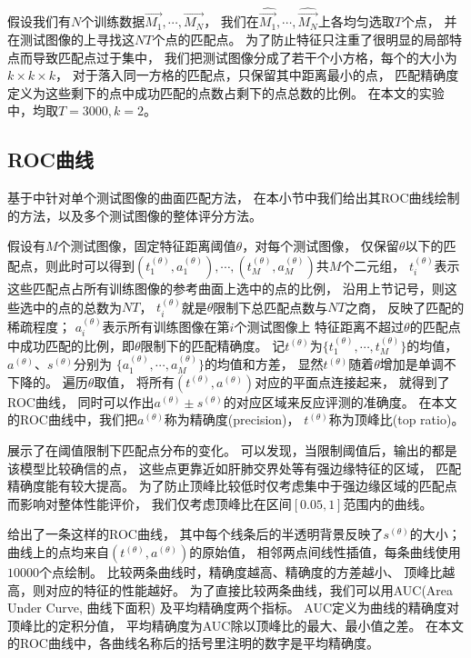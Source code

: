 假设我们有$N$个训练数据$\vec{M_1},\cdots,\vec{M_N}$，
我们在$\hat{\vec{M_1}},\cdots,\hat{\vec{M_N}}$上各均匀选取$T$个点，
并在测试图像的上寻找这$NT$个点的匹配点。
为了防止特征只注重了很明显的局部特点而导致匹配点过于集中，
我们把测试图像分成了若干个小方格，每个的大小为$k\times k \times k$，
对于落入同一方格的匹配点，只保留其中距离最小的点，
匹配精确度定义为这些剩下的点中成功匹配的点数占剩下的点总数的比例。
在本文的实验中，均取$T=3000, k=2$。


\subsection{ROC曲线}
基于中针对单个测试图像的曲面匹配方法，
在本小节中我们给出其ROC曲线绘制的方法，以及多个测试图像的整体评分方法。

假设有$M$个测试图像，固定特征距离阈值$\theta$，对每个测试图像，
仅保留$\theta$以下的匹配点，则此时可以得到$(t_1^{(\theta)},
a_1^{(\theta)}),\cdots,(t_M^{(\theta)}, a_M^{(\theta)})$共$M$个二元组，
$t_i^{(\theta)}$表示这些匹配点占所有训练图像的参考曲面上选中的点的比例，
沿用上节记号，则这些选中的点的总数为$NT$，
$t_i^{(\theta)}$就是$\theta$限制下总匹配点数与$NT$之商，
反映了匹配的稀疏程度；
$a_i^{(\theta)}$表示所有训练图像在第$i$个测试图像上
特征距离不超过$\theta$的匹配点中成功匹配的比例，即$\theta$限制下的匹配精确度。
记$t^{(\theta)}$为$\{t_1^{(\theta)},\cdots,t_M^{(\theta)}\}$的均值，
$a^{(\theta)}$、$s^{(\theta)}$分别为
$\{a_1^{(\theta)},\cdots,a_M^{(\theta)}\}$的均值和方差，
显然$t^{(\theta)}$随着$\theta$增加是单调不下降的。
遍历$\theta$取值，
将所有$(t^{(\theta)}, a^{(\theta)})$对应的平面点连接起来，
就得到了ROC曲线，
同时可以作出$a^{(\theta)} \pm s^{(\theta)}$的对应区域来反应评测的准确度。
在本文的ROC曲线中，我们把$a^{(\theta)}$称为精确度(precision)，
$t^{(\theta)}$称为顶峰比(top ratio)。

展示了在阈值限制下匹配点分布的变化。
可以发现，当限制阈值后，输出的都是该模型比较确信的点，
这些点更靠近如肝肺交界处等有强边缘特征的区域，
匹配精确度能有较大提高。
为了防止顶峰比较低时仅考虑集中于强边缘区域的匹配点而影响对整体性能评价，
我们仅考虑顶峰比在区间$[0.05, 1]$范围内的曲线。

给出了一条这样的ROC曲线，
其中每个线条后的半透明背景反映了$s^{(\theta)}$的大小；
曲线上的点均来自$(t^{(\theta)}, a^{(\theta)})$的原始值，
相邻两点间线性插值，每条曲线使用$10000$个点绘制。
比较两条曲线时，精确度越高、精确度的方差越小、
顶峰比越高，则对应的特征的性能越好。
为了直接比较两条曲线，我们可以用AUC(Area Under Curve, 曲线下面积)
及平均精确度两个指标。
AUC定义为曲线的精确度对顶峰比的定积分值，
平均精确度为AUC除以顶峰比的最大、最小值之差。
在本文的ROC曲线中，各曲线名称后的括号里注明的数字是平均精确度。

